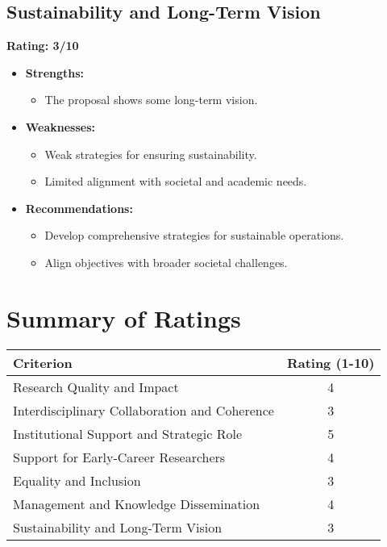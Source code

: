 \documentclass{article}
\begin{document}
\subsection{Sustainability and Long-Term Vision}
\textbf{Rating: 3/10}
\begin{itemize}
    \item \textbf{Strengths:}
    \begin{itemize}
        \item The proposal shows some long-term vision.
    \end{itemize}
    \item \textbf{Weaknesses:}
    \begin{itemize}
        \item Weak strategies for ensuring sustainability.
        \item Limited alignment with societal and academic needs.
    \end{itemize}
    \item \textbf{Recommendations:}
    \begin{itemize}
        \item Develop comprehensive strategies for sustainable operations.
        \item Align objectives with broader societal challenges.
    \end{itemize}
\end{itemize}

\section{Summary of Ratings}

\begin{center}
\begin{tabularx}{\textwidth}{|X|c|}
\hline
\textbf{Criterion} & \textbf{Rating (1-10)} \\
\hline
Research Quality and Impact & 4 \\
Interdisciplinary Collaboration and Coherence & 3 \\
Institutional Support and Strategic Role & 5 \\
Support for Early-Career Researchers & 4 \\
Equality and Inclusion & 3 \\
Management and Knowledge Dissemination & 4 \\
Sustainability and Long-Term Vision & 3 \\
\hline
\end{tabularx}
\end{center}
\end{document}
